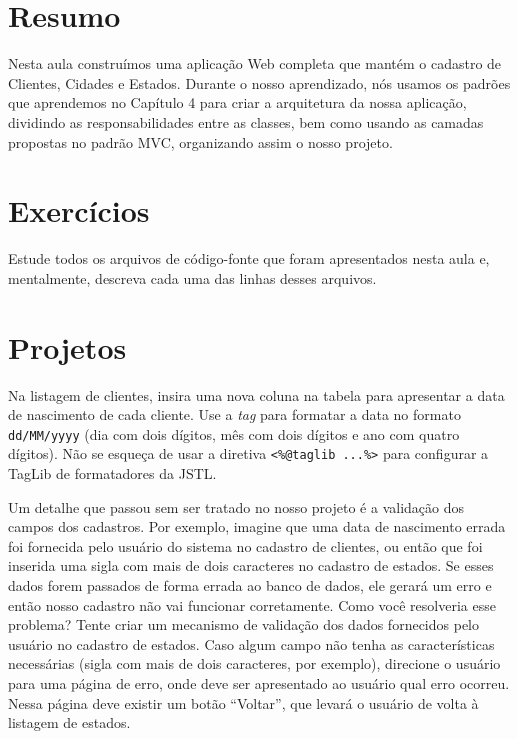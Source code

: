 \section{Resumo}

Nesta aula construímos uma aplicação Web completa que mantém o cadastro de Clientes, Cidades e Estados. Durante o nosso aprendizado, nós usamos os padrões que aprendemos no Capítulo 4 para criar a arquitetura da nossa aplicação, dividindo as responsabilidades entre as classes, bem como usando as camadas propostas no padrão MVC, organizando assim o nosso projeto. 


\section{Exercícios}

\begin{exercicioSemArquivo}{}{}{}
    Estude todos os arquivos de código-fonte que foram apresentados nesta aula e, mentalmente, descreva cada uma das linhas desses arquivos.
\end{exercicioSemArquivo}


\section{Projetos}

\begin{projetoSemArquivo}{}{}{}
    Na listagem de clientes, insira uma nova coluna na tabela para apresentar a data de nascimento de cada cliente. Use a \textit{tag}  para formatar a data no formato \texttt{dd/MM/yyyy} (dia com dois dígitos, mês com dois dígitos e ano com quatro dígitos). Não se esqueça de usar a diretiva \texttt{<\%@taglib ...\%>} para configurar a TagLib de formatadores da JSTL. 
\end{projetoSemArquivo}

\begin{projetoSemArquivo}{}{}{}
    Um detalhe que passou sem ser tratado no nosso projeto é a validação dos campos dos cadastros. Por exemplo, imagine que uma data de nascimento errada foi fornecida pelo usuário do sistema no cadastro de clientes, ou então que foi inserida uma sigla com mais de dois caracteres no cadastro de estados. Se esses dados forem passados de forma errada ao banco de dados, ele gerará um erro e então nosso cadastro não vai funcionar corretamente. Como você resolveria esse problema? Tente criar um mecanismo de validação dos dados fornecidos pelo usuário no cadastro de estados. Caso algum campo não tenha as características necessárias (sigla com mais de dois caracteres, por exemplo), direcione o usuário para uma página de erro, onde deve ser apresentado ao usuário qual erro ocorreu. Nessa página deve existir um botão ``Voltar'', que levará o usuário de volta à listagem de estados.
\end{projetoSemArquivo}

